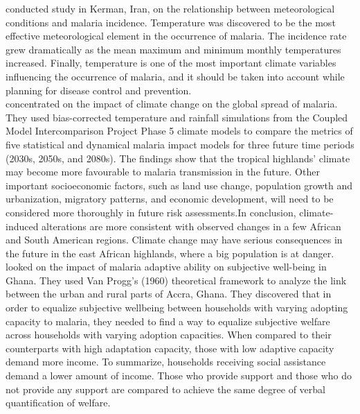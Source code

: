 \noindent \cite{mohammadkhani2016relation} conducted study in Kerman, Iran, on the relationship between meteorological conditions and malaria incidence. Temperature was discovered to be the most effective meteorological element in the occurrence of malaria. The incidence rate grew dramatically as the mean maximum and minimum monthly temperatures increased. Finally, temperature is one of the most important climate variables influencing the occurrence of malaria, and it should be taken into account while planning for disease control and prevention.\\


\noindent \cite{caminade2014impact} concentrated on the impact of climate change on the global spread of malaria. They used bias-corrected temperature and rainfall simulations from the Coupled Model Intercomparison Project Phase 5 climate models to compare the metrics of five statistical and dynamical malaria impact models for three future time periods (2030s, 2050s, and 2080s). The findings show that the tropical highlands' climate may become more favourable to malaria transmission in the future. Other important socioeconomic factors, such as land use change, population growth and urbanization, migratory patterns, and economic development, will need to be considered more thoroughly in future risk assessments.In conclusion, climate-induced alterations are more consistent with observed changes in a few African and South American regions. Climate change may have serious consequences in the future in the east African highlands, where a big population is at danger.\\


\noindent \cite{christian2021effect} looked on the impact of malaria adaptive ability on subjective well-being in Ghana. They used Van Progg's (1960) theoretical framework to analyze the link between the urban and rural parts of Accra, Ghana. They discovered that in order to equalize subjective wellbeing between households with varying adopting capacity to malaria, they needed to find a way to equalize subjective welfare across households with varying adoption capacities. When compared to their counterparts with high adaptation capacity, those with low adaptive capacity demand more income. To summarize, households receiving social assistance demand a lower amount of income. Those who provide support and those who do not provide any support are compared to achieve the same degree of verbal quantification of welfare.\\

